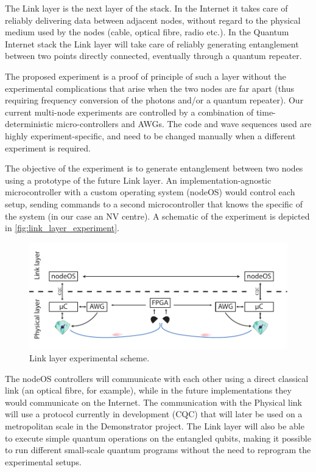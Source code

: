 \documentclass[a4paper, twoside]{article}
\begin{document}
The Link layer is the next layer of the stack. In the Internet it takes care of reliably delivering data between adjacent nodes, without regard to the physical medium used by the nodes (cable, optical fibre, radio etc.).  In the Quantum Internet stack the Link layer will take care of reliably generating entanglement between two points directly connected, eventually through a quantum repeater.

The proposed experiment is a proof of principle of such a layer without the experimental complications that arise when the two nodes are far apart (thus requiring frequency conversion of the photons and/or a quantum repeater).
Our current multi-node experiments are controlled by a combination of time-deterministic micro-controllers and \acp{AWG}. The code and wave sequences used are highly experiment-specific, and need to be changed manually when a different experiment is required.

The objective of the experiment is to generate entanglement between two nodes using a prototype of the future Link layer.
An implementation-agnostic microcontroller with a custom operating system (nodeOS) would control each setup, sending commands to a second microcontroller that knows the specific of the system (in our case an NV centre). A schematic of the experiment is depicted in \autoref{fig:link_layer_experiment}.

\begin{figure}
	\includegraphics[width=\textwidth]{images/figure4}
	\caption{Link layer experimental scheme.}
	\label{fig:link_layer_experiment}
\end{figure}

The nodeOS controllers will communicate with each other using a direct classical link (an optical fibre, for example), while in the future implementations they would communicate on the Internet. The communication with the Physical link will use a protocol currently in development (\ac{CQC}) that will later be used on a metropolitan scale in the Demonstrator project.
The Link layer will also be able to execute simple quantum operations on the entangled qubits, making it possible to run different small-scale quantum programs without the need to reprogram the experimental setups.
\end{document}
